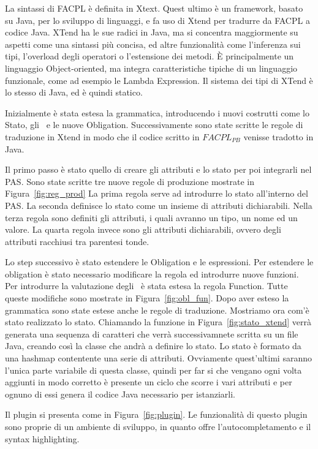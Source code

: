 La sintassi di \ac{FACPL} è definita in Xtext. Quest ultimo è un framework, basato su Java, per lo sviluppo di linguaggi, e fa uso di Xtend per tradurre da \ac{FACPL} a codice Java.
XTend ha le sue radici in Java, ma si concentra maggiormente su aspetti come una sintassi più concisa, ed altre funzionalità come l'inferenza sui tipi, l'overload degli operatori o l'estensione dei metodi. 
È principalmente un linguaggio Object-oriented, ma integra caratteristiche tipiche di un linguaggio funzionale, come ad esempio le Lambda Expression. Il sistema dei tipi di XTend è lo stesso di Java, ed è quindi statico.\par
Inizialmente è stata estesa la grammatica, introducendo i nuovi costrutti come lo Stato, gli \statusattribute \ e le nuove Obligation.
Successivamente sono state scritte le regole di traduzione in Xtend in modo che il codice scritto in $FACPL_{PB}$ venisse tradotto in Java.\par
Il primo passo è stato quello di creare gli attributi e lo stato per poi integrarli nel PAS.
Sono state scritte tre nuove regole di produzione mostrate in Figura~\ref{fig:reg_prod}
La prima regola serve ad introdurre lo stato all'interno del PAS.
La seconda definisce lo stato come un insieme di attributi dichiarabili.
Nella terza regola sono definiti gli attributi, i quali avranno un tipo, un nome ed un valore.
La quarta regola invece sono gli attributi dichiarabili, ovvero degli attributi racchiusi tra parentesi tonde.\par
Lo step successivo è stato estendere le Obligation e le espressioni.
Per estendere le obligation è stato necessario modificare la regola ed introdurre nuove funzioni. Per introdurre la valutazione degli \statusattribute \ è stata estesa la regola Function. Tutte queste modifiche sono mostrate in Figura~\ref{fig:obl_fun}.
Dopo aver esteso la grammatica sono state estese anche le regole di traduzione. Mostriamo ora com'è stato realizzato lo stato.
Chiamando la funzione in Figura~\ref{fig:stato_xtend} verrà generata una sequenza di caratteri che verrà successivamnete scritta su un file Java, creando così la classe che andrà a definire lo stato.
Lo stato è formato da una hashmap contentente una serie di attributi. Ovviamente quest'ultimi saranno l'unica parte variabile di questa classe, quindi per far si che vengano ogni volta aggiunti in modo corretto è presente un ciclo che scorre i vari attributi e per ognuno di essi genera il codice Java necessario per istanziarli. \par
Il plugin si presenta come in Figura~\ref{fig:plugin}. Le funzionalità di questo plugin sono proprie di un ambiente di sviluppo, in quanto offre l'autocompletamento e il syntax highlighting. 



